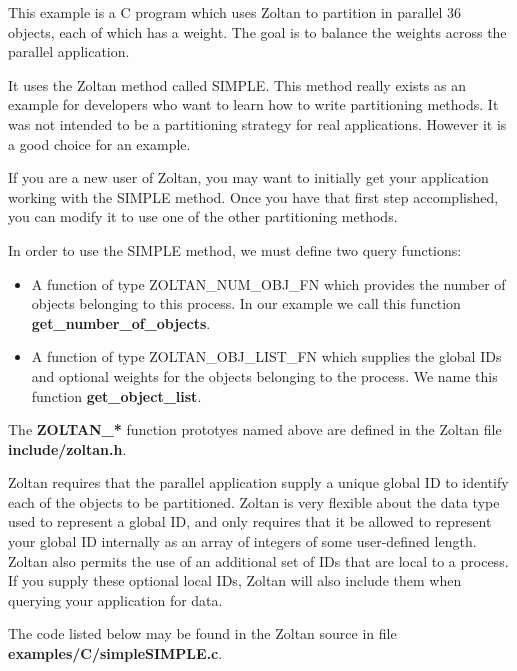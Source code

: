 This example is a C program which uses Zoltan to partition
in parallel 36 objects, each of which has a weight.  The goal is
to balance the weights across the parallel application.

It uses the Zoltan method called SIMPLE. 
This method really exists as an example for developers
who want to learn how to write partitioning methods.  It was
not intended to be a partitioning strategy for real applications.
However it is a good choice for an example.  

If you are a new user of Zoltan, you may want to initially get your
application working with the SIMPLE method.  Once you have
that first step accomplished, you can modify it to use one of the
other partitioning methods.

In order to use the SIMPLE method, we must define two query functions:

\begin{itemize}
\item A function of type ZOLTAN\_NUM\_OBJ\_FN which provides the number of objects belonging to this process.  In our example we call this function \textbf{get\_number\_of\_objects}.
\item A function of type ZOLTAN\_OBJ\_LIST\_FN which supplies the global IDs and optional weights for the objects belonging to the process.  We name this function \textbf{get\_object\_list}.
\end{itemize}

The \textbf{ZOLTAN\_*} function prototyes named above
are defined in the Zoltan file \textbf{include/zoltan.h}.

Zoltan requires that the parallel application supply a unique 
global ID to identify each of the objects to be partitioned.
Zoltan is very flexible about the data type used to represent
a global ID, and only requires that it be allowed to represent
your global ID internally as an array of integers of some user-defined
length.  Zoltan also permits the use of an additional set of
IDs that are local to a process.  If you supply these optional local IDs,
Zoltan will also include them when querying your application for data.

The code listed below may be found in the Zoltan source in file
\textbf{examples/C/simpleSIMPLE.c}.

